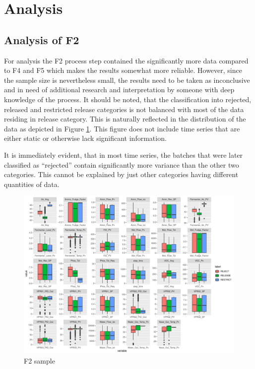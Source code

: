 \section{Analysis}
\label{sec:analysis}
\subsection{Analysis of F2}
For analysis the F2 process step contained the significantly more data compared to F4 and F5 which makes the results somewhat more reliable. However, since the sample size is nevertheless small, the results need to be taken as inconclusive and in need of additional research and interpretation by someone with deep knowledge of the process. It should be noted, that the classification into rejected, released and restricted release categories is not balanced with most of the data residing in release category. This is naturally reflected in the distribution of the data as depicted in Figure \ref{fig:f2_sample}. This figure does not include time series that are either static or otherwise lack significant information. 

It is immediately evident, that in most time series, the batches that were later classified as ``rejected'' contain significantly more variance than the other two categories. This cannot be explained by just other categories having different quantities of data.

\begin{figure}[ht!]
    \centering
    \includegraphics[width=1.0\textwidth]{plots/f2-sample.pdf}
    \caption{F2 sample}
    \label{fig:f2_sample}
\end{figure}


